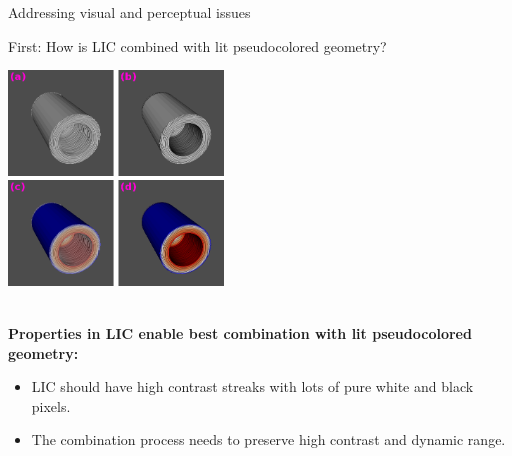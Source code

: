 \documentclass[notes]{beamer}
\begin{document}
\begin{frame}{Addressing visual and perceptual issues}
\begin{beamerboxesrounded}{First: How is LIC combined with lit pseudocolored geometry?}
\begin{minipage}{0.45\linewidth}
\begin{center}
    \includegraphics[width=2.25in]{blending-vs-mapping.png}
    \end{center}
    \end{minipage} \vspace{0.05in} \\
    {\bf \footnotesize Properties in LIC enable best combination with lit pseudocolored geometry:}
    \begin{itemize}
    \scriptsize
    \item LIC should have high contrast streaks with lots of pure white and black pixels.
    \item The combination process needs to preserve high contrast and dynamic range.
    \end{itemize}
    \end{beamerboxesrounded}
\end{frame}
\end{document}
